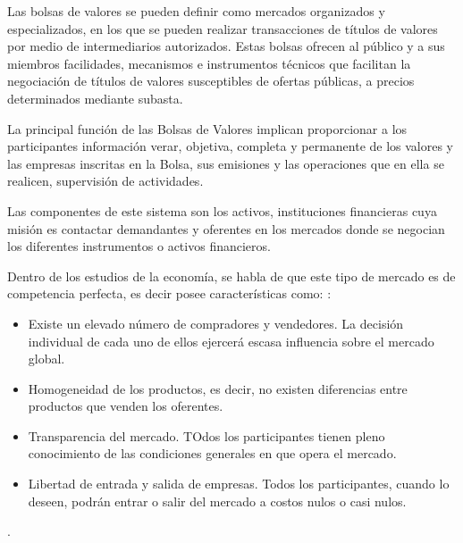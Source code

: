Las bolsas de valores se pueden definir como mercados organizados y especializados, en los que se pueden realizar transacciones de títulos de valores por
medio de intermediarios autorizados. Estas bolsas ofrecen al público y a sus miembros facilidades, mecanismos e instrumentos técnicos que facilitan la negociación
de títulos de valores susceptibles de ofertas públicas, a precios determinados mediante subasta.

La principal función de las Bolsas de Valores implican proporcionar a los participantes información verar, objetiva, completa y permanente de los valores
y las empresas inscritas en la Bolsa, sus emisiones y las operaciones que en ella se realicen, supervisión de actividades.

Las componentes de este sistema son los activos, instituciones financieras cuya misión es contactar demandantes y oferentes en los mercados donde se negocian
los diferentes instrumentos o activos financieros.

Dentro de los estudios de la economía, se habla de que este tipo de mercado es de competencia perfecta, es decir posee características 
como: \cite{mankiw2011principles}:
\begin{itemize}
        \item Existe un elevado número de compradores y vendedores. La decisión individual de cada uno de ellos ejercerá escasa influencia sobre el mercado global.
        \item Homogeneidad de los productos, es decir, no existen diferencias entre productos que venden los oferentes.
        \item Transparencia del mercado. TOdos los participantes tienen pleno conocimiento de las condiciones generales en que opera el mercado.
        \item Libertad de entrada y salida de empresas. Todos los participantes, cuando lo deseen, podrán entrar o salir del mercado a costos nulos o casi nulos.
\end{itemize}.

